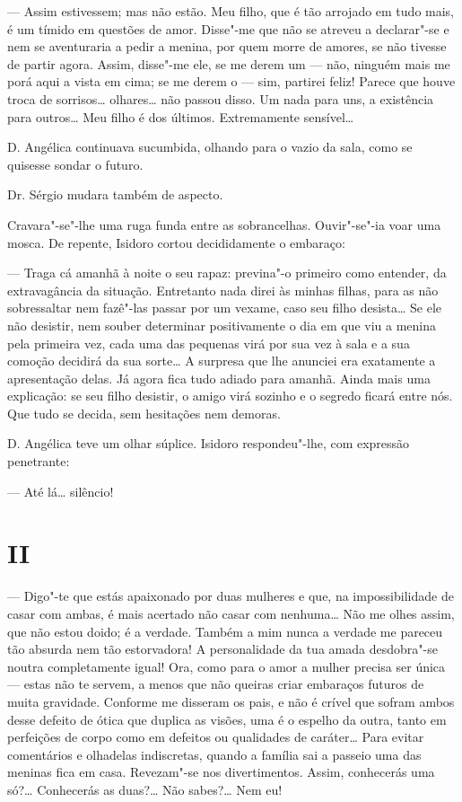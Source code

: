 --- Assim estivessem; mas não estão. Meu filho, que é tão arrojado em
tudo mais, é um tímido em questões de amor. Disse"-me que não se atreveu
a declarar"-se e nem se aventuraria a pedir a menina, por quem morre de
amores, se não tivesse de partir agora. Assim, disse"-me ele, se me derem
um --- não, ninguém mais me porá aqui a vista em cima; se me derem o ---
sim, partirei feliz! Parece que houve troca de sorrisos\ldots{} olhares\ldots{}
não passou disso. Um nada para uns, a existência para outros\ldots{} Meu
filho é dos últimos. Extremamente sensível\ldots{}

D. Angélica continuava sucumbida, olhando para o vazio da sala, como se
quisesse sondar o futuro.

Dr. Sérgio mudara também de aspecto.

Cravara"-se"-lhe uma ruga funda entre as sobrancelhas. Ouvir"-se"-ia voar
uma mosca. De repente, Isidoro cortou decididamente o embaraço:

--- Traga cá amanhã à noite o seu rapaz: previna"-o primeiro como
entender, da extravagância da situação. Entretanto nada direi às minhas
filhas, para as não sobressaltar nem fazê"-las passar por um vexame, caso
seu filho desista\ldots{} Se ele não desistir, nem souber determinar
positivamente o dia em que viu a menina pela primeira vez, cada uma das
pequenas virá por sua vez à sala e a sua comoção decidirá da sua
sorte\ldots{} A surpresa que lhe anunciei era exatamente a apresentação
delas. Já agora fica tudo adiado para amanhã. Ainda mais uma explicação:
se seu filho desistir, o amigo virá sozinho e o segredo ficará entre
nós. Que tudo se decida, sem hesitações nem demoras.

D. Angélica teve um olhar súplice. Isidoro respondeu"-lhe, com expressão
penetrante:

--- Até lá\ldots{} silêncio!

\section{II}

--- Digo"-te que estás apaixonado por duas mulheres e que, na
impossibilidade de casar com ambas, é mais acertado não casar com
nenhuma\ldots{} Não me olhes assim, que não estou doido; é a verdade. Também
a mim nunca a verdade me pareceu tão absurda nem tão estorvadora! A
personalidade da tua amada desdobra"-se noutra completamente igual! Ora,
como para o amor a mulher precisa ser única --- estas não te servem, a
menos que não queiras criar embaraços futuros de muita gravidade.
Conforme me disseram os pais, e não é crível que sofram ambos desse
defeito de ótica que duplica as visões, uma é o espelho da outra, tanto
em perfeições de corpo como em defeitos ou qualidades de caráter\ldots{} Para
evitar comentários e olhadelas indiscretas, quando a família sai a
passeio uma das meninas fica em casa. Revezam"-se nos divertimentos.
Assim, conhecerás uma só?\ldots{} Conhecerás as duas?\ldots{} Não sabes?\ldots{} Nem
eu!

